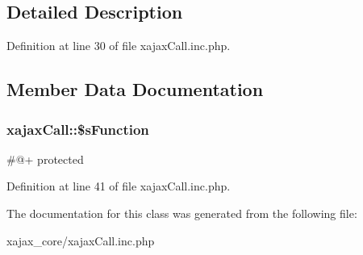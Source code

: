 \subsection{Detailed Description}


Definition at line 30 of file xajaxCall.inc.php.



\subsection{Member Data Documentation}
\hypertarget{classxajaxCall_ac3a8de12b1d810747d01510eb332c962}{
\subsubsection[{\$sFunction}]{\setlength{\rightskip}{0pt plus 5cm}xajaxCall::\$sFunction}}
\label{classxajaxCall_ac3a8de12b1d810747d01510eb332c962}
\#@+  protected 

Definition at line 41 of file xajaxCall.inc.php.



The documentation for this class was generated from the following file:\begin{DoxyCompactItemize}
\item 
xajax\_\-core/xajaxCall.inc.php\end{DoxyCompactItemize}

